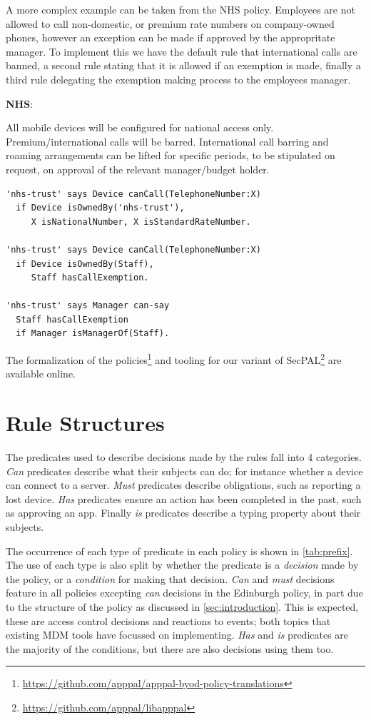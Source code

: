 \documentclass[conference,twocolumn]{IEEEtran}
\newenvironment{policyrule}[1]{%
  \begin{mdframed}\footnotesize
    \noindent\textbf{\sffamily #1}:~\itshape%
  }{%
  \end{mdframed}
}
\begin{document}
A more complex example can be taken from the NHS policy.
Employees are not allowed to call non-domestic, or premium rate numbers on company-owned phones, however an exception can be made if approved by the appropritate manager.
To implement this we have the default rule that international calls are banned, a second rule stating that it is allowed if an exemption is made, finally a third rule delegating the exemption making process to the employees manager.
\begin{policyrule}{NHS}
  All mobile devices will be configured for national access only. Premium/international calls will be barred. 
  International call barring and roaming arrangements can be lifted for specific periods, to be stipulated on request, on approval of the relevant manager/budget holder.
  \begin{lstlisting}
'nhs-trust' says Device canCall(TelephoneNumber:X) 
  if Device isOwnedBy('nhs-trust'),
     X isNationalNumber, X isStandardRateNumber.

'nhs-trust' says Device canCall(TelephoneNumber:X)
  if Device isOwnedBy(Staff),
     Staff hasCallExemption.

'nhs-trust' says Manager can-say
  Staff hasCallExemption
  if Manager isManagerOf(Staff).
  \end{lstlisting}
\end{policyrule}

The formalization of the policies\footnote{\url{https://github.com/apppal/apppal-byod-policy-translations}} and tooling for our variant of SecPAL\footnote{\url{https://github.com/apppal/libapppal}} are available online.

\section{Rule Structures}

The predicates used to describe decisions made by the rules fall into 4 categories.
\emph{Can} predicates describe what their subjects can do; for instance whether a device can connect to a server.
\emph{Must} predicates describe obligations, such as reporting a lost device.
\emph{Has} predicates ensure an action has been completed in the past, such as approving an app.
Finally \emph{is} predicates describe a typing property about their subjects.

The occurrence of each type of predicate in each policy is shown in \autoref{tab:prefix}.
The use of each type is also split by whether the predicate is a \emph{decision} made by the policy, or a \emph{condition} for making that decision.
\emph{Can} and \emph{must} decisions feature in all policies excepting \emph{can} decisions in the Edinburgh policy, in part due to the structure of the policy as discussed in \autoref{sec:introduction}.
This is expected, these are access control decisions and reactions to events; both topics that existing MDM tools have focussed on implementing.
\emph{Has} and \emph{is} predicates are the majority of the conditions, but there are also decisions using them too.
\end{document}
